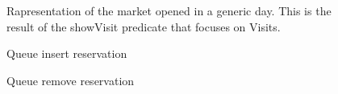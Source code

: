 \begin{figure}[H]

  \label{showVisit}
  \centering
  \caption{Rapresentation of the market opened in a generic day. This is the result of the showVisit predicate that focuses on Visits.}
    
\end{figure}


\begin{figure}[H]
  \label{addInQueue}
  \centering
    \caption{Queue insert reservation}
\end{figure}


\begin{figure}[H]
  \label{deInQueue}
  \centering
    \caption{Queue remove reservation}
\end{figure}

